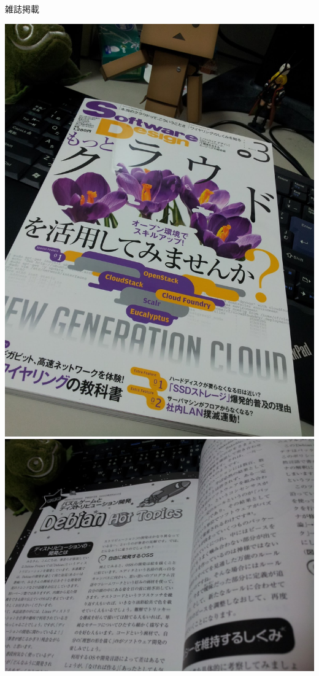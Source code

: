 \begin{frame}{雑誌掲載}
\begin{center}
\includegraphics[height=0.5\textheight]{image201302/osc-tokyo/sd-201303-top.jpg}
\includegraphics[height=0.5\textheight]{image201302/osc-tokyo/sd-201303-rensai.jpg}
\end{center}
\end{frame}

